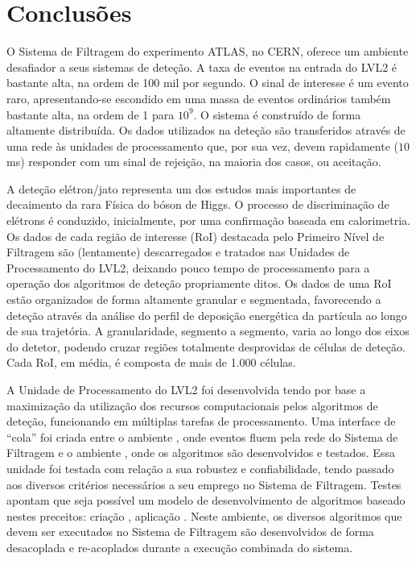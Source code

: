 \typeout{ ====================================================================}
\typeout{ ====================================================================}

\chapter{Conclusões}
\label{chap:conclusions}

O Sistema de Filtragem do experimento ATLAS, no CERN, oferece um ambiente
desafiador a seus sistemas de deteção. A taxa de eventos na entrada do LVL2 é
bastante alta, na ordem de 100 mil por segundo. O sinal de interesse é um
evento raro, apresentando-se escondido em uma massa de eventos ordinários
também bastante alta, na ordem de 1 para $10^9$. O sistema é construído de
forma altamente distribuída. Os dados utilizados na deteção são transferidos
através de uma rede às unidades de processamento que, por sua vez, devem
rapidamente ($10$ ms) responder com um sinal de rejeição, na maioria dos
casos, ou aceitação.

A deteção elétron/jato representa um dos estudos mais importantes de
decaimento da rara Física do bóson de Higgs. O processo de discriminação de
elétrons é conduzido, inicialmente, por uma confirmação baseada em
calorimetria. Os dados de cada região de interesse (RoI) destacada pelo
Primeiro Nível de Filtragem são (lentamente) descarregados e tratados nas
Unidades de Processamento do LVL2, deixando pouco tempo de processamento para
a operação dos algoritmos de deteção propriamente ditos. Os dados de uma RoI
estão organizados de forma altamente granular e segmentada, favorecendo a
deteção através da análise do perfil de deposição energética da partícula ao
longo de sua trajetória. A granularidade, segmento a segmento, varia ao longo
dos eixos do detetor, podendo cruzar regiões totalmente desprovidas de células
de deteção. Cada RoI, em média, é composta de mais de 1.000 células.

A Unidade de Processamento do LVL2 foi desenvolvida tendo por base a
maximização da utilização dos recursos computacionais pelos algoritmos de
deteção, funcionando em múltiplas tarefas de processamento. Uma interface de
``cola'' foi criada entre o ambiente , onde eventos fluem pela
rede do Sistema de Filtragem e o ambiente , onde os algoritmos
são desenvolvidos e testados. Essa unidade foi testada com relação a sua
robustez e confiabilidade, tendo passado aos diversos critérios necessários a
seu emprego no Sistema de Filtragem. Testes apontam que seja possível um
modelo de desenvolvimento de algoritmos baseado nestes preceitos: criação
, aplicação . Neste ambiente, os diversos algoritmos
que devem ser executados no Sistema de Filtragem são desenvolvidos de forma
desacoplada e re-acoplados durante a execução combinada do sistema.

